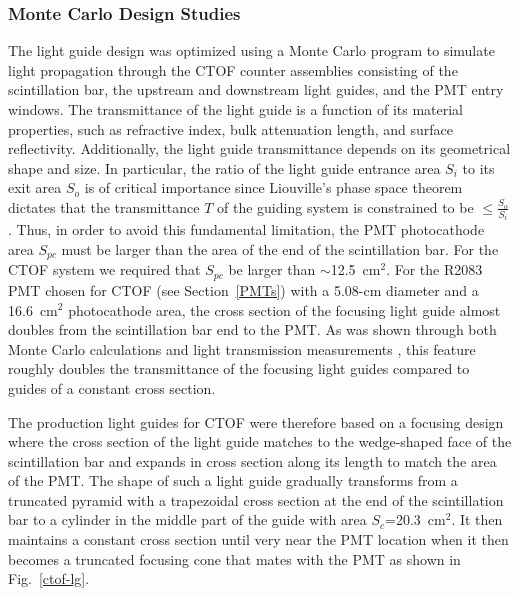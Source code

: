 \documentclass{elsart}
\begin{document}
\subsubsection{Monte Carlo Design Studies}
\label{lg-mc}

The light guide design was optimized using a Monte Carlo program to simulate light propagation
through the CTOF counter assemblies consisting of the scintillation bar, the upstream and
downstream light guides, and the PMT entry windows. The transmittance of the light guide is a
function of its material properties, such as refractive index, bulk attenuation length, and
surface reflectivity. Additionally, the light guide transmittance depends on its geometrical
shape and size. In particular, the ratio of the light guide entrance area $S_i$ to its exit
area $S_o$ is of critical importance since Liouville's phase space theorem dictates that the 
transmittance $T$ of the guiding system is constrained to be $\le \frac{S_o}{S_i}$. Thus, in
order to avoid this fundamental limitation, the PMT photocathode area $S_{pc}$ must be larger
than the area of the end of the scintillation bar. For the CTOF system we required that $S_{pc}$
be larger than $\sim$12.5~cm$^2$. For the R2083 PMT chosen for CTOF (see
Section~\ref{PMTs}) with a 5.08-cm diameter and a 16.6~cm$^2$ photocathode area, the cross
section of the focusing light guide almost doubles from the scintillation bar end to the PMT. As
was shown through both Monte Carlo calculations and light transmission measurements
\cite{barbosa06}, this feature roughly doubles the transmittance of the focusing light guides
compared to guides of a constant cross section.

The production light guides for CTOF were therefore based on a focusing design where 
the cross section of the light guide matches to the wedge-shaped face of the scintillation bar 
and expands in cross section along its length to match the area of the PMT. The shape of such a 
light guide gradually transforms from a truncated pyramid with a trapezoidal cross section at 
the end of the scintillation bar to a cylinder in the middle part of the guide with area 
$S_c$=20.3~cm$^2$. It then maintains a constant cross section until very near the PMT location 
when it then becomes a truncated focusing cone that mates with the PMT as shown in
Fig.~\ref{ctof-lg}.
\end{document}
